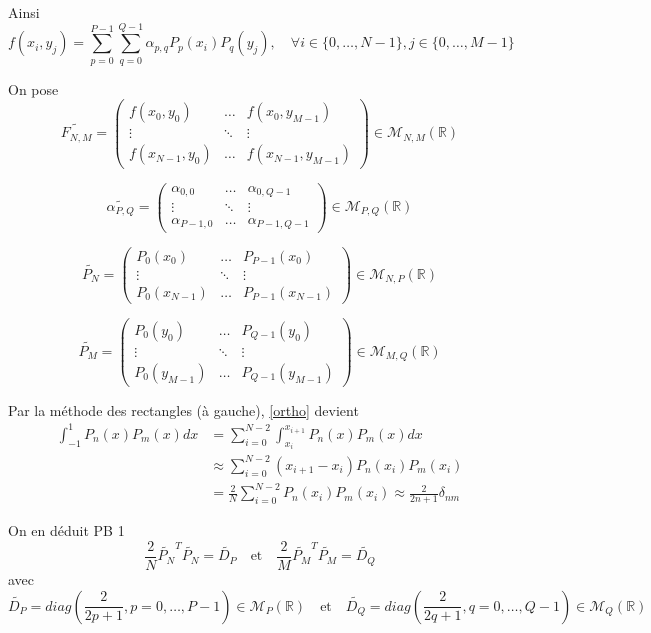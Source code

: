 Ainsi
$$f(x_i,y_j)=\sum_{p=0}^{P-1}\sum_{q=0}^{Q-1}\alpha_{p,q}P_p(x_i)P_q(y_j), \quad \forall i\in\{0,\dots,N-1\},j\in\{0,\dots,M-1\}$$

On pose
$$\widetilde{F_{N,M}}=\begin{pmatrix}
	f(x_0,y_0) & \dots & f(x_0,y_{M-1}) \\
	\vdots & \ddots & \vdots \\
	f(x_{N-1},y_0) & \dots & f(x_{N-1},y_{M-1})
\end{pmatrix}\in\mathcal{M}_{N,M}(\mathbb{R})$$

$$\widetilde{\alpha_{P,Q}}=\begin{pmatrix}
	\alpha_{0,0} & \dots & \alpha_{0,Q-1} \\
	\vdots & \ddots & \vdots \\
	\alpha_{P-1,0} & \dots & \alpha_{P-1,Q-1}
\end{pmatrix}\in\mathcal{M}_{P,Q}(\mathbb{R})$$

$$\widetilde{P_N}=\begin{pmatrix}
	P_0(x_0) & \dots & P_{P-1}(x_0) \\
	\vdots & \ddots & \vdots \\
	P_0(x_{N-1}) & \dots & P_{P-1}(x_{N-1})
\end{pmatrix}\in\mathcal{M}_{N,P}(\mathbb{R})$$

$$\widetilde{P_M}=\begin{pmatrix}
	P_0(y_0) & \dots & P_{Q-1}(y_0) \\
	\vdots & \ddots & \vdots \\
	P_0(y_{M-1}) & \dots & P_{Q-1}(y_{M-1})
\end{pmatrix}\in\mathcal{M}_{M,Q}(\mathbb{R})$$

Par la méthode des rectangles (à gauche), \ref{ortho} devient
\begin{align*}
	\int_{-1}^1 P_n(x)P_m(x)dx&=\sum_{i=0}^{N-2}\int_{x_i}^{x_{i+1}}P_n(x)P_m(x)dx \\
	&\approx \sum_{i=0}^{N-2} (x_{i+1}-x_i)P_n(x_i)P_m(x_i) \\
	&=\frac{2}{N}\sum_{i=0}^{N-2} P_n(x_i)P_m(x_i) \approx\frac{2}{2n+1}\delta_{nm} 
\end{align*}

On en déduit \color{red}PB 1\color{black}
\begin{equation}
	\frac{2}{N}\widetilde{P_N}^T\widetilde{P_N}=\widetilde{D_P} \quad \text{et} \quad \frac{2}{M}\widetilde{P_M}^T\widetilde{P_M}=\widetilde{D_Q}
	\label{diag}
\end{equation}
avec
$$\widetilde{D_P}=diag\left(\frac{2}{2p+1},p=0,\dots,P-1\right)\in\mathcal{M}_P(\mathbb{R}) \quad \text{et} \quad \widetilde{D_Q}=diag\left(\frac{2}{2q+1},q=0,\dots,Q-1\right)\in\mathcal{M}_Q(\mathbb{R})$$

